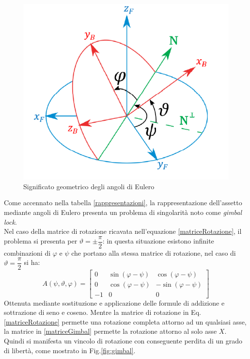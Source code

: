 \begin{figure}[H]  
	\centering 
	\includegraphics[scale=0.8]{elaborazione/eulero.png}
	\caption{Significato geometrico degli angoli di Eulero \cite{assetto2}}
	\label{fig:eulero}
\end{figure}
Come accennato nella tabella \ref{rappresentazioni}, la rappresentazione dell'assetto mediante angoli di Eulero presenta un problema di singolarità noto come \textit{gimbal lock}.\\
Nel caso della matrice di rotazione ricavata nell'equazione \ref{matriceRotazione}, il problema si presenta per $\vartheta = \pm \dfrac{\pi}{2}$: in questa situazione esistono infinite combinazioni di $\varphi$ e $\psi$ che portano alla stessa matrice di rotazione, nel caso di $\vartheta= \dfrac{\pi}{2}$ si ha:
\begin{equation}
\label{matriceGimbal}
A(\psi,\vartheta,\varphi)= \begin{bmatrix}
0   &\sin(\varphi - \psi) & \cos(\varphi - \psi) \\
0    & \cos(\varphi-\psi)  &-\sin(\varphi - \psi)\\
-1    & 0 & 0
\end{bmatrix}
\end{equation}
Ottenuta mediante sostituzione e applicazione delle formule di addizione e sottrazione di seno e coseno. Mentre la matrice di rotazione in Eq.\ref{matriceRotazione} permette una rotazione completa attorno ad un qualsiasi asse, la matrice in \ref{matriceGimbal} permette la rotazione attorno al solo asse $X$. Quindi si manifesta un vincolo di rotazione con conseguente perdita di un grado di libertà, come mostrato in Fig.\ref{fig:gimbal}. \\
